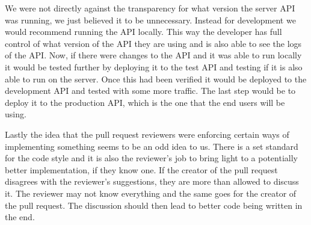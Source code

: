 We were not directly against the transparency for what version the server API was running, we just believed it to be unnecessary.
Instead for development we would recommend running the API locally.
This way the developer has full control of what version of the API they are using and is also able to see the logs of the API.
Now, if there were changes to the API and it was able to run locally it would be tested further by deploying it to the test API and testing if it is also able to run on the server.
Once this had been verified it would be deployed to the development API and tested with some more traffic.
The last step would be to deploy it to the production API, which is the one that the end users will be using.

Lastly the idea that the pull request reviewers were enforcing certain ways of implementing something seems to be an odd idea to us.
There is a set standard for the code style and it is also the reviewer's job to bring light to a potentially better implementation, if they know one.
If the creator of the pull request disagrees with the reviewer's suggestions, they are more than allowed to discuss it. 
The reviewer may not know everything and the same goes for the creator of the pull request.
The discussion should then lead to better code being written in the end.
